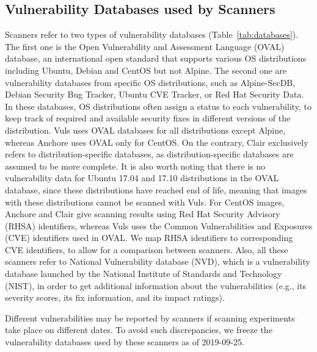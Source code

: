 \subsection{Vulnerability Databases used by Scanners}

Scanners refer to two types of
vulnerability databases (Table~\ref{tab:databases}). The first one is the Open Vulnerability and
Assessment Language (OVAL) database, an international open standard that
supports various OS distributions including Ubuntu, Debian and CentOS but
not Alpine. The second one are vulnerability databases from specific OS
distributions, such as Alpine-SecDB, Debian Security Bug Tracker, Ubuntu
CVE Tracker, or Red Hat Security Data. In these databases, OS distributions often assign a
status to each vulnerability, to keep track of required and available
security fixes in different versions of the distribution. Vuls uses OVAL
databases for all distributions except Alpine, whereas Anchore uses OVAL only for CentOS. 
On the contrary, Clair exclusively refers to
distribution-specific databases, as distribution-specific databases
are assumed to be more complete.
It is also worth noting that there is no vulnerability data
for Ubuntu 17.04 and 17.10 distributions in the OVAL database, since these
distributions have reached end of life, meaning that images with these
distributions cannot be scanned with Vuls.
For CentOS images, Anchore and Clair give scanning results using Red Hat
Security Advisory (RHSA) identifiers, whereas Vuls uses the Common
Vulnerabilities and Exposures (CVE) identifiers used in OVAL. We map
RHSA identifiers to corresponding CVE identifiers, to allow for a
comparison between scanners. Also, all these scanners refer to
National Vulnerability database (NVD), which is a vulnerability database 
launched by the National Institute of Standards and Technology (NIST),
in order to get additional information about the vulnerabilities (e.g.,
its severity scores, its fix information, and its impact ratings).

Different vulnerabilities may be reported by scanners if scanning
experiments take place on different dates. To avoid such discrepancies, we
freeze the vulnerability databases used by these scanners as of 2019-09-25.


